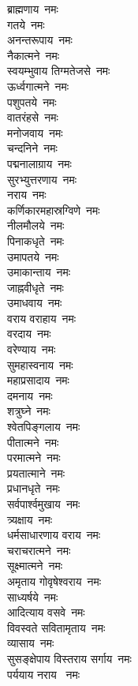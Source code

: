 \begin{multicols}{2}
\begin{flushleft}
ब्राह्मणाय~नमः\\
गतये~नमः\\
अनन्तरूपाय~नमः\\
नैकात्मने~नमः\\
स्वयम्भुवाय तिग्मतेजसे~नमः\\
ऊर्ध्वगात्मने~नमः\\
पशुपतये~नमः\\
वातरंहसे~नमः\\
मनोजवाय~नमः\\
चन्दनिने~नमः\hfill{}\\
पद्मनालाग्राय~नमः\\
सुरभ्युत्तरणाय~नमः\\
नराय~नमः\\
कर्णिकारमहास्रग्विणे~नमः\\
नीलमौलये~नमः\\
पिनाकधृते~नमः\\
उमापतये~नमः\\
उमाकान्ताय~नमः\\
जाह्नवीधृते~नमः\\
उमाधवाय~नमः\hfill{}\\
वराय वराहाय~नमः\\
वरदाय~नमः\\
वरेण्याय~नमः\\
सुमहास्वनाय~नमः\\
महाप्रसादाय~नमः\\
दमनाय~नमः\\
शत्रुघ्ने~नमः\\
श्वेतपिङ्गलाय~नमः\\
पीतात्मने~नमः\\
परमात्मने~नमः\hfill{}\\
प्रयतात्माने~नमः\\
प्रधानधृते~नमः\\
सर्वपार्श्वमुखाय~नमः\\
त्र्यक्षाय~नमः\\
धर्मसाधारणाय वराय~नमः\\
चराचरात्मने~नमः\\
सूक्ष्मात्मने~नमः\\
अमृताय गोवृषेश्वराय~नमः\\
साध्यर्षये~नमः\\
आदित्याय वसवे~नमः\hfill{}\\
विवस्वते सवितामृताय~नमः\\
व्यासाय~नमः\\
सुसङ्क्षेपाय विस्तराय सर्गाय~नमः\\
पर्ययाय नराय ~नमः\\

\end{flushleft}
\end{multicols}

